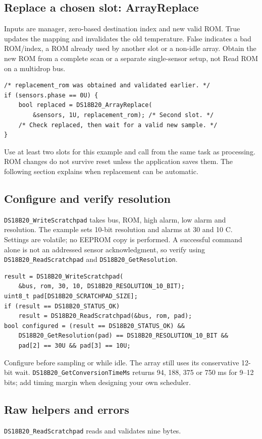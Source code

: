 \subsection{Replace a chosen slot: ArrayReplace}
Inputs are manager, zero-based destination index and new valid ROM. True updates
the mapping and invalidates the old temperature. False indicates a bad ROM/index,
a ROM already used by another slot or a non-idle array. Obtain the new ROM from
a complete scan or a separate single-sensor setup, not Read ROM on a multidrop bus.
\begin{lstlisting}
/* replacement_rom was obtained and validated earlier. */
if (sensors.phase == 0U) {
    bool replaced = DS18B20_ArrayReplace(
        &sensors, 1U, replacement_rom); /* Second slot. */
    /* Check replaced, then wait for a valid new sample. */
}
\end{lstlisting}
Use at least two slots for this example and call from the same task as processing.
ROM changes do not survive reset unless the application saves them. The following
section explains when replacement can be automatic.

\subsection{Configure and verify resolution}
\texttt{DS18B20\_WriteScratchpad} takes bus, ROM, high alarm, low alarm and resolution.
The example sets 10-bit resolution and alarms at 30 and 10 C. Settings are volatile;
no EEPROM copy is performed. A successful command alone is not an addressed sensor
acknowledgment, so verify using \texttt{DS18B20\_ReadScratchpad} and
\texttt{DS18B20\_GetResolution}.
\begin{lstlisting}
result = DS18B20_WriteScratchpad(
    &bus, rom, 30, 10, DS18B20_RESOLUTION_10_BIT);
uint8_t pad[DS18B20_SCRATCHPAD_SIZE];
if (result == DS18B20_STATUS_OK)
    result = DS18B20_ReadScratchpad(&bus, rom, pad);
bool configured = (result == DS18B20_STATUS_OK) &&
    DS18B20_GetResolution(pad) == DS18B20_RESOLUTION_10_BIT &&
    pad[2] == 30U && pad[3] == 10U;
\end{lstlisting}
Configure before sampling or while idle. The array still uses its conservative
12-bit wait. \texttt{DS18B20\_GetConversionTimeMs} returns 94, 188, 375 or 750 ms
for 9--12 bits; add timing margin when designing your own scheduler.

\subsection{Raw helpers and errors}
\texttt{DS18B20\_ReadScratchpad} reads and validates nine bytes.

